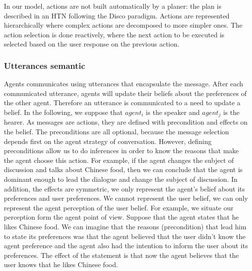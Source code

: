 \documentclass{llncs}
\begin{document}
\begin{itemize}
	
	In our model, actions are not built automatically by a planer: the plan is described in an HTN following the Disco \cite{rich2009building} paradigm. Actions are represented hierarchically where complex actions are decomposed to more simpler ones. The action selection is done reactively, where the next action to be executed is selected based on the user response on the previous action. 
	
	
\end{itemize}


\subsubsection{Utterances semantic}
Agents communicates using utterances that encapsulate the message. After each communicated utterance, agents will update their beliefs about the preferences of the other agent. Therefore an utterance is communicated to a need to update a belief. In the following, we suppose that $agent_{i}$ is the speaker and $agent_{j}$ is the hearer. As messages are actions, they are defined with precondition and effects on the belief. The preconditions are all optional, because the message selection depends first on the agent strategy of conversation. However, defining preconditions allow us to do inferences in order to know the reasons that make the agent choose this action. For example, if the agent changes the subject of discussion and talks about Chinese food, then we can conclude that the agent is dominant enough to lead the dialogue and change the subject of discussion. In addition, the effects are symmetric, we only represent the  agent's belief about its preferences and user preferences. We cannot represent the user belief, we can only represent the agent perception of the user belief. For example, we situate our perception form the agent point of view. Suppose that the agent states that he likes Chinese food.  We can imagine that the reasons (precondition) that lead him  to state its preferences was that the agent believed that the user didn't know the agent preference and the agent also had the intention to inform the user about its preferences. The effect of the statement is that now the agent believes that the user knows that he likes Chinese food. 
\end{document}
